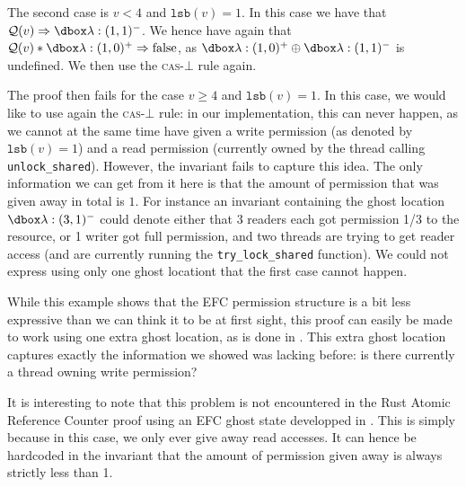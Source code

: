 The second case is $v < 4$ and $\texttt{lsb}(v) = 1$. In this case we have that $\mathcal{Q}(v) \Rightarrow \efcm{1}{1}$. We hence have again that  $\mathcal{Q}(v) * \efcp{1}{0} \Rightarrow \text{false}$, as $\efcp{1}{0} \oplus \efcm{1}{1}$ is undefined. We then use the \textsc{cas}-$\bot$ rule again.

The proof then fails for the case $v \ge 4$ and $\texttt{lsb}(v) = 1$. In this case, we would like to use again the \textsc{cas}-$\bot$ rule: in our implementation, this can never happen, as we cannot at the same time have given a write permission (as denoted by $\texttt{lsb}(v) = 1$) and a read permission (currently owned by the thread calling \texttt{unlock\_shared}). However, the invariant fails to capture this idea. The only information we can get from it here is that the amount of permission that was given away in total is $1$. For instance an invariant containing the ghost location $\ghost{\lambda:(3, 1)^-}$ could denote either that 3 readers each got permission 1/3 to the resource, or 1 writer got full permission, and two threads are trying to get reader access (and are currently running the \texttt{try\_lock\_shared} function). We could not express using only one ghost locationt that the first case cannot happen.

While this example shows that the EFC permission structure is a bit less expressive than we can think it to be at first sight, this proof can easily be made to work using one extra ghost location, as is done in \cite{gaurav}. This extra ghost location captures exactly the information we showed was lacking before: is there currently a thread owning write permission?

It is interesting to note that this problem is not encountered in the Rust Atomic Reference Counter proof using an EFC ghost state developped in \cite{gaurav}. This is simply because in this case, we only ever give away read accesses. It can hence be hardcoded in the invariant that the amount of permission given away is always strictly less than 1.


